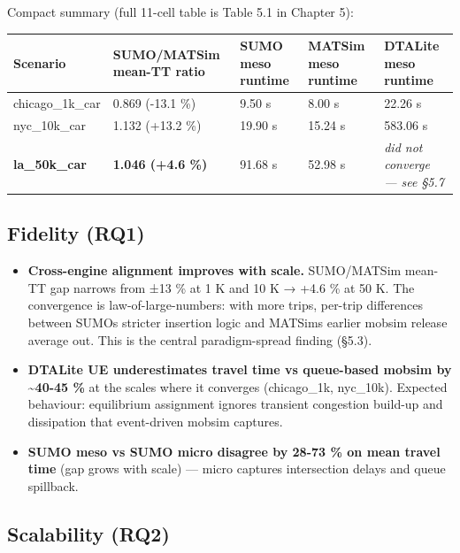 Compact summary (full 11-cell table is Table 5.1 in Chapter 5):

\begin{longtable}[]{@{}lllll@{}}
\toprule\noalign{}
Scenario & SUMO/MATSim mean-TT ratio & SUMO meso runtime & MATSim meso
runtime & DTALite meso runtime \\
\midrule\noalign{}
\endhead
\bottomrule\noalign{}
\endlastfoot
chicago\_1k\_car & 0.869 (-13.1 \%) & 9.50 s & 8.00 s & 22.26 s \\
nyc\_10k\_car & 1.132 (+13.2 \%) & 19.90 s & 15.24 s & 583.06 s \\
\textbf{la\_50k\_car} & \textbf{1.046 (+4.6 \%)} & 91.68 s & 52.98 s &
\emph{did not converge --- see §5.7} \\
\end{longtable}

\subsection{Fidelity (RQ1)}\label{442-fidelity-rq1}

\begin{itemize}
\tightlist
\item
  \textbf{Cross-engine alignment improves with scale.} SUMO/MATSim
  mean-TT gap narrows from ±13 \% at 1 K and 10 K → +4.6 \% at 50 K. The
  convergence is law-of-large-numbers: with more trips, per-trip
  differences between SUMO\textquotesingle s stricter insertion logic
  and MATSim\textquotesingle s earlier mobsim release average out. This
  is the central paradigm-spread finding (§5.3).
\item
  \textbf{DTALite UE underestimates travel time vs queue-based mobsim by
  \textasciitilde40-45 \%} at the scales where it converges
  (chicago\_1k, nyc\_10k). Expected behaviour: equilibrium assignment
  ignores transient congestion build-up and dissipation that
  event-driven mobsim captures.
\item
  \textbf{SUMO meso vs SUMO micro disagree by 28-73 \% on mean travel
  time} (gap grows with scale) --- micro captures intersection delays
  and queue spillback.
\end{itemize}

\subsection{Scalability (RQ2)}\label{443-scalability-rq2}

